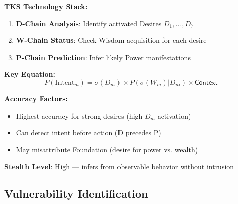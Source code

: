 \documentclass[11pt,twoside]{book}
\begin{document}
\begin{tcolorbox}[colback=yellow!5!white,colframe=yellow!65!black,title=\textbf{Intent Detection Capability}]
\textbf{TKS Technology Stack:}
\begin{enumerate}
    \item \textbf{D-Chain Analysis}: Identify activated Desires $D_1, \ldots, D_7$
    \item \textbf{W-Chain Status}: Check Wisdom acquisition for each desire
    \item \textbf{P-Chain Prediction}: Infer likely Power manifestations
\end{enumerate}

\textbf{Key Equation:}
\begin{equation}
    P(\text{Intent}_m) = \sigma(D_m) \times P(\sigma(W_m) | D_m) \times \mathsf{Context}
\end{equation}

\textbf{Accuracy Factors:}
\begin{itemize}
    \item Highest accuracy for strong desires (high $D_m$ activation)
    \item Can detect intent before action (D precedes P)
    \item May misattribute Foundation (desire for power vs. wealth)
\end{itemize}

\textbf{Stealth Level}: High --- infers from observable behavior without intrusion
\end{tcolorbox}

\subsection{Vulnerability Identification}
\end{document}
